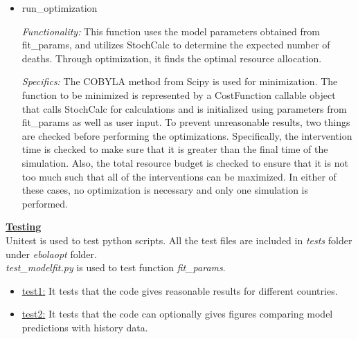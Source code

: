 \documentclass[11pt,letter]{article}
\begin{document}
\begin{itemize}
  \item run\_optimization
  
   \emph{Functionality:} 
  This function uses the model parameters obtained from fit\_params, and utilizes StochCalc to determine the expected number of deaths. Through optimization, it finds the optimal resource allocation.
  
 \emph{Specifics:} 
The COBYLA method from Scipy is used for minimization. The function to be minimized is represented by a CostFunction callable object that calls StochCalc for calculations and is initialized using parameters from fit\_params as well as user input. To prevent unreasonable results, two things are checked before performing the optimizations. Specifically, the intervention time is checked to make sure that it is greater than the final time of the simulation. Also, the total resource budget is checked to ensure that it is not too much such that all of the interventions can be maximized. In either of these cases, no optimization is necessary and only one simulation is performed.
\end{itemize}

\underline{\textbf{Testing}}\vspace{0.5mm}\\

Unitest is used to test python scripts. All the test files are included in \emph{tests} folder under \emph{ebolaopt} folder. \\

\emph{test\_modelfit.py} is used to test function \emph{fit\_params}. 

\begin{itemize}

\item \underline{test1:} It tests that the code gives reasonable results for different countries.
\item \underline{test2:} It tests that the code can optionally gives figures comparing model predictions with history data.

\end{itemize}
\end{document}
